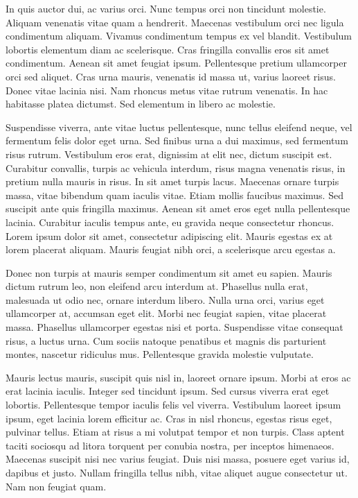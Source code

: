 In quis auctor dui, ac varius orci. Nunc tempus orci non tincidunt molestie. Aliquam venenatis vitae quam a hendrerit. Maecenas vestibulum orci nec ligula condimentum aliquam. Vivamus condimentum tempus ex vel blandit. Vestibulum lobortis elementum diam ac scelerisque. Cras fringilla convallis eros sit amet condimentum. Aenean sit amet feugiat ipsum. Pellentesque pretium ullamcorper orci sed aliquet. Cras urna mauris, venenatis id massa ut, varius laoreet risus. Donec vitae lacinia nisi. Nam rhoncus metus vitae rutrum venenatis. In hac habitasse platea dictumst. Sed elementum in libero ac molestie.

Suspendisse viverra, ante vitae luctus pellentesque, nunc tellus eleifend neque, vel fermentum felis dolor eget urna. Sed finibus urna a dui maximus, sed fermentum risus rutrum. Vestibulum eros erat, dignissim at elit nec, dictum suscipit est. Curabitur convallis, turpis ac vehicula interdum, risus magna venenatis risus, in pretium nulla mauris in risus. In sit amet turpis lacus. Maecenas ornare turpis massa, vitae bibendum quam iaculis vitae. Etiam mollis faucibus maximus. Sed suscipit ante quis fringilla maximus. Aenean sit amet eros eget nulla pellentesque lacinia. Curabitur iaculis tempus ante, eu gravida neque consectetur rhoncus. Lorem ipsum dolor sit amet, consectetur adipiscing elit. Mauris egestas ex at lorem placerat aliquam. Mauris feugiat nibh orci, a scelerisque arcu egestas a.

Donec non turpis at mauris semper condimentum sit amet eu sapien. Mauris dictum rutrum leo, non eleifend arcu interdum at. Phasellus nulla erat, malesuada ut odio nec, ornare interdum libero. Nulla urna orci, varius eget ullamcorper at, accumsan eget elit. Morbi nec feugiat sapien, vitae placerat massa. Phasellus ullamcorper egestas nisi et porta. Suspendisse vitae consequat risus, a luctus urna. Cum sociis natoque penatibus et magnis dis parturient montes, nascetur ridiculus mus. Pellentesque gravida molestie vulputate.

Mauris lectus mauris, suscipit quis nisl in, laoreet ornare ipsum. Morbi at eros ac erat lacinia iaculis. Integer sed tincidunt ipsum. Sed cursus viverra erat eget lobortis. Pellentesque tempor iaculis felis vel viverra. Vestibulum laoreet ipsum ipsum, eget lacinia lorem efficitur ac. Cras in nisl rhoncus, egestas risus eget, pulvinar tellus. Etiam at risus a mi volutpat tempor et non turpis. Class aptent taciti sociosqu ad litora torquent per conubia nostra, per inceptos himenaeos. Maecenas suscipit nisi nec varius feugiat. Duis nisi massa, posuere eget varius id, dapibus et justo. Nullam fringilla tellus nibh, vitae aliquet augue consectetur ut. Nam non feugiat quam.

